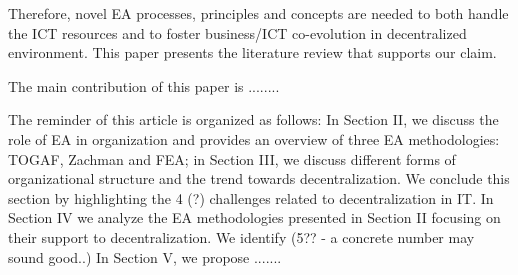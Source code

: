 
Therefore,  novel EA processes, principles and concepts are needed to both handle the ICT resources and to foster business/ICT co-evolution in decentralized environment. This paper presents the literature review that supports our claim. 

The main contribution of this paper is ........


The reminder of this article is organized as follows: In Section II, we discuss the role of EA in organization and provides an overview of three EA methodologies: TOGAF, Zachman and FEA;  in Section III, we discuss different forms of organizational structure and the trend towards decentralization. We conclude this section by highlighting the 4 (?) challenges related to  decentralization in IT. In Section IV we analyze the EA methodologies presented in Section II focusing on their support to decentralization. We identify (5?? - a concrete number may sound good..) In Section V, we propose ....... 

% 
% 
% 
% 
% 
% 
% 
% 
% 
% 
% 
% 
% 
% 
% 
% 
% 